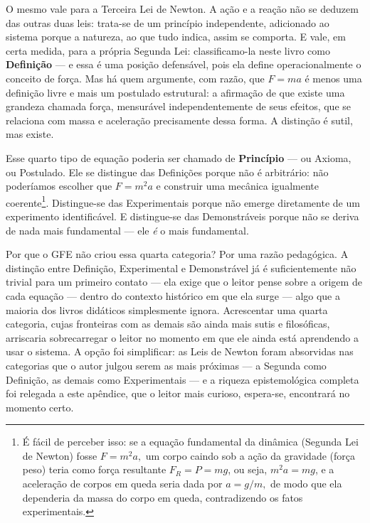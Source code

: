 O mesmo vale para a Terceira Lei de Newton. A ação e a reação não se
deduzem das outras duas leis: trata-se de um princípio independente, adicionado
ao sistema porque a natureza, ao que tudo indica, assim se comporta. E
vale, em certa medida, para a própria Segunda Lei: classificamo-la neste
livro como \textbf{Definição} --- e essa é uma posição defensável, pois
ela define operacionalmente o conceito de força. Mas há quem argumente,
com razão, que $F = ma$ é menos uma definição livre e mais um postulado
estrutural: a afirmação de que existe uma grandeza chamada força,
mensurável independentemente de seus efeitos, que se relaciona com massa
e aceleração precisamente dessa forma. A distinção é sutil, mas existe.

Esse quarto tipo de equação poderia ser chamado de \textbf{Princípio} --- ou Axioma, ou Postulado. Ele se distingue das Definições porque não é
arbitrário: não poderíamos escolher que $F = m^2a$ e construir uma
mecânica igualmente coerente\footnote{É fácil de perceber isso: se a equação fundamental da dinâmica (Segunda Lei de Newton) fosse $F=m^2a,$ um corpo caindo sob a ação da gravidade (força peso) teria como força resultante $F_R = P =mg$, ou seja,  $  m^{2} a =  mg$, e a aceleração de corpos em queda seria dada por $a=g/m,$ de modo que ela dependeria da massa do corpo em queda, contradizendo os fatos experimentais.}. Distingue-se das Experimentais porque não
emerge diretamente de um experimento identificável. E distingue-se das
Demonstráveis porque não se deriva de nada mais fundamental --- ele
\textit{é} o mais fundamental.


Por que o GFE não criou essa quarta categoria? Por uma razão pedagógica. A distinção entre Definição, Experimental e Demonstrável já é
suficientemente não trivial para um primeiro contato --- ela exige que
o leitor pense sobre a origem de cada equação --- dentro do contexto histórico em que ela surge --- algo que
a maioria dos livros didáticos simplesmente ignora. Acrescentar uma
quarta categoria, cujas fronteiras com as demais são ainda mais sutis e
filosóficas, arriscaria sobrecarregar o leitor no momento em que ele
ainda está aprendendo a usar o sistema. A opção foi simplificar: as
Leis de Newton foram absorvidas nas categorias que o autor julgou serem as mais próximas --- a
Segunda como Definição, as demais como Experimentais --- e a riqueza
epistemológica completa foi relegada a este apêndice, que o leitor mais
curioso, espera-se, encontrará no momento certo.



